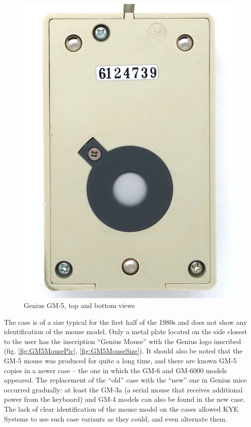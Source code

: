 \documentclass[11pt, a4paper]{article}
\begin{document}
\begin{figure}[h]
    \includegraphics[scale=0.8]{1987_genius_gm5_mouse/bottom_30.jpg}
    \caption{Genius GM-5, top and bottom views}
    \label{fig:GM5MouseTopAndBottom}
\end{figure}

The case is of a size typical for the first half of the 1980s and does not show any identification of the mouse model. Only a metal plate located on the side closest to the user has the inscription ``Genius Mouse'' with the Genius logo inscribed (fig. \ref{fig:GM5MousePic}, \ref{fig:GM5MouseSize}). It should also be noted that the GM-5 mouse was produced for quite a long time, and there are known GM-5 copies in a newer case -- the one in which the GM-6 and GM-6000 \cite{commodore} models appeared. The replacement of the ``old'' case with the ``new'' one in Genius mice occurred gradually: at least the GM-3a (a serial mouse that receives additional power from the keyboard) and GM-4 models can also be found in the new case. The lack of clear identification of the mouse model on the cases allowed KYE Systems to use such case variants as they could, and even alternate them.
\end{document}
